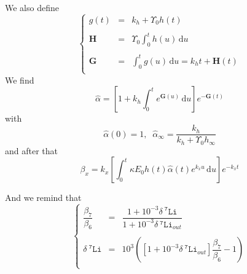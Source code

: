 \documentclass[aps,onecolumn,12pt]{revtex4}
\newcommand{\mychem}[1]{\mathtt{#1}}
\newcommand{\spLi}[1]{{~^{\mychem{#1}}\mychem{Li}}}
\newcommand{\deltaLi}{ {\delta\!\!\!\spLi{7}} }
\newcommand{\ih}{\ensuremath{\mathbf{H}}}
\newcommand{\ig}{\ensuremath{\mathbf{G}}}
\begin{document}
We also define
\begin{equation}
\left\lbrace
\begin{array}{rcl}
g(t) & = & k_h + \Upsilon_0 h(t) \\
\\
\ih  & = & \displaystyle \Upsilon_0\int_0^t h(u) \, \mathrm{d}u\\
\\
\ig  & = &  \displaystyle \int_0^t g(u) \, \mathrm{d}u = k_h t +  \ih(t)\\
\end{array}
\right.
\end{equation}
We find
\begin{equation}
	\hat\alpha = \left[ 1 + k_h \int_0^t e^{\ig(u)}\,\mathrm{d}u \right] e^{-\ig(t)}
\end{equation}
with
\begin{equation}
	\hat\alpha(0) = 1,\;\;\hat\alpha_\infty = \dfrac{k_h}{k_h+\Upsilon_0 h_\infty}
\end{equation}
and after that
\begin{equation}
\beta_x = k_x\left[\int_0^t \kappa E_0 h(t) \hat\alpha(t) e^{k_xu} \, \mathrm{d}u\right] e^{-k_xt}
\end{equation}

And we remind that
\begin{equation}
\left\lbrace
\begin{array}{rcl}
	\dfrac{\beta_7}{\beta_6} & = & \dfrac{1+10^{-3}\deltaLi}{1+10^{-3}\deltaLi_{out}} \\
	\\
	\deltaLi & = & 10^3 \left( \left[1+10^{-3}\deltaLi_{out}\right] \dfrac{\beta_7}{\beta_6} - 1 \right)\\
\end{array}
\right.
\end{equation}
\end{document}
